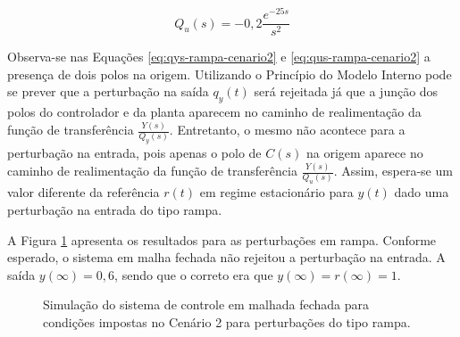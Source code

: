 \begin{equation}
    \label{eq:qus-rampa-cenario2}
    Q_{u}(s) = -0,2\frac{e^{-25s}}{s^{2}}
\end{equation}

Observa-se nas Equações \ref{eq:qys-rampa-cenario2} e
\ref{eq:qus-rampa-cenario2} a presença de dois polos na origem. Utilizando o
Princípio do Modelo Interno pode se prever que a perturbação na saída $q_{y}(t)$
será rejeitada já que a junção dos polos do controlador e da planta aparecem no
caminho de realimentação da função de transferência $\frac{Y(s)}{Q_{y}(s)}$.
Entretanto, o mesmo não acontece para a perturbação na entrada, pois apenas o
polo de $C(s)$ na origem aparece no caminho de realimentação da função de
transferência $\frac{Y(s)}{Q_{u}(s)}$. Assim, espera-se um valor diferente da
referência $r(t)$ em regime estacionário para $y(t)$ dado uma perturbação na
entrada do tipo rampa.

A Figura \ref{fig:resultado-cenario2-b} apresenta os resultados para as
perturbações em rampa. Conforme esperado, o sistema em malha fechada não
rejeitou a perturbação na entrada. A saída $y(\infty) = 0,6$, sendo que o correto
era que $y(\infty) = r(\infty) = 1$.

\begin{figure}[!ht]
    \caption{Simulação do sistema de controle em malhada fechada para condições
    impostas no Cenário 2 para perturbações do tipo rampa.}
    \vspace{-10pt}
    \hspace{-30pt}
    \label{fig:resultado-cenario2-b}
    \begin{minipage}{\linewidth}
        
    \end{minipage}
\end{figure}